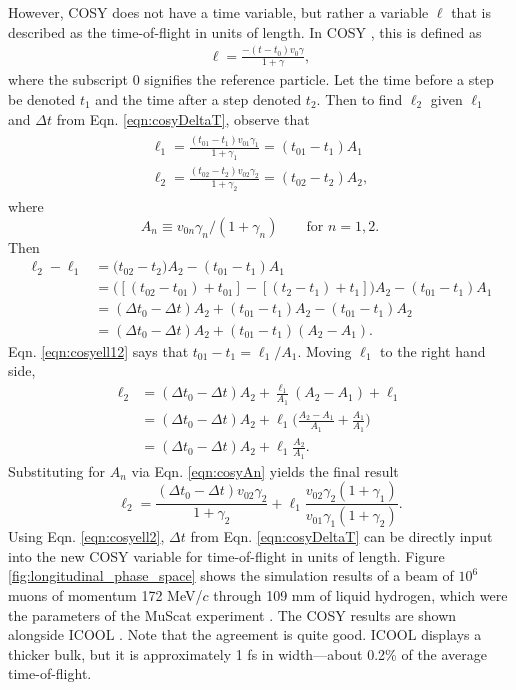 However, COSY does not have a time variable, but rather a variable $\ell$ that is described as the time-of-flight in units of length. In COSY \cite{cosy}, this is defined as
\begin{align*}
\ell=\frac{-(t-t_0)v_0\gamma}{1+\gamma},
\end{align*}
where the subscript $0$ signifies the reference particle. Let the time before a step be denoted $t_1$ and the time after a step denoted $t_2$. Then to find $\ell_2$ given $\ell_1$ and $\Delta t$ from Eqn. \ref{eqn:cosyDeltaT}, observe that
\begin{align} \label{eqn:cosyell12}
\begin{split}
\ell_1=\frac{(t_{01}-t_1)v_{01}\gamma_1}{1+\gamma_1} = (t_{01}-t_1)A_1\\
\ell_2=\frac{(t_{02}-t_2)v_{02}\gamma_2}{1+\gamma_2} = (t_{02}-t_2)A_2,
\end{split}
\end{align}
where 
\begin{equation}\label{eqn:cosyAn}
A_n \equiv v_{0n}\gamma_n / (1+\gamma_n) \qquad \text{for }n=1,2.
\end{equation}
Then
\begin{align*}
\ell_2 - \ell_1 &=\big(t_{02}-t_2\big)A_2-(t_{01}-t_1)A_1\\
&=\big([(t_{02}-t_{01})+t_{01}]-[(t_2-t_1)+t_1]\big)A_2-(t_{01}-t_1)A_1\\
&=(\Delta t_0 - \Delta t )A_2 + (t_{01}-t_1)A_2-(t_{01}-t_1)A_2\\
&=(\Delta t_0 - \Delta t )A_2 + (t_{01}-t_1)(A_2-A_1).
\end{align*}
Eqn. \ref{eqn:cosyell12} says that $t_{01}-t_1=\ell_1/A_1$. Moving $\ell_1$ to the right hand side,
\begin{align*}
\ell_2 &= (\Delta t_0 - \Delta t)A_2 + \frac{\ell_1}{A_1}(A_2-A_1)+\ell_1\\
&=(\Delta t_0 - \Delta t)A_2 + \ell_1\Big(\frac{A_2-A_1}{A_1}+\frac{A_1}{A_1}\Big)\\
&=(\Delta t_0 - \Delta t)A_2 + \ell_1\frac{A_2}{A_1}.
\end{align*}
Substituting for $A_n$ via Eqn. \ref{eqn:cosyAn} yields the final result
\begin{equation}\label{eqn:cosyell2}
\ell_2=\frac{(\Delta t_0 - \Delta t) v_{02}\gamma_2}{1+\gamma_2}+\ell_1 \frac{v_{02}\gamma_2 (1+\gamma_1)}{v_{01}\gamma_1 (1+\gamma_2)}.
\end{equation}
Using Eqn. \ref{eqn:cosyell2}, $\Delta t$ from Eqn. \ref{eqn:cosyDeltaT} can be directly input into the new COSY variable for time-of-flight in units of length. Figure \ref{fig:longitudinal_phase_space} shows the simulation results of a beam of $10^6$ muons of momentum 172 MeV/$c$ through 109 mm of liquid hydrogen, which were the parameters of the MuScat experiment \cite{muscat}. The COSY results are shown alongside ICOOL \cite{icool}. Note that the agreement is quite good. ICOOL displays a thicker bulk, but it is approximately 1 fs in width---about 0.2\% of the average time-of-flight.

